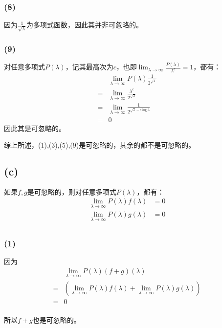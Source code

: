 \documentclass[twoside,11pt]{article}
\begin{document}
\subsubsection*{(8)}
因为$\frac{1}{\sqrt{\lambda}}$为多项式函数，因此其并非可忽略的。

\subsubsection*{(9)}
对任意多项式$P(\lambda)$，记其最高次为$c$，也即$\lim_{\lambda \to \infty} \frac{P(\lambda)}{\lambda^c}=1$，都有：
\begin{align*}
      & \lim_{\lambda \to \infty} P(\lambda) \frac{1}{2^{\sqrt{\lambda}}}     \\
    = & \lim_{\lambda \to \infty} \frac{\lambda^c}{2^{\sqrt{\lambda}}}        \\
    = & \lim_{\lambda \to \infty} \frac{1}{2^{\sqrt{\lambda}-c \log \lambda}} \\
    = & 0
\end{align*}
因此其是可忽略的。

综上所述，(1),(3),(5),(9)是可忽略的，其余的都不是可忽略的。

\subsection*{(c)}
如果$f,g$是可忽略的，则对任意多项式$P(\lambda)$，都有：
\begin{align*}
    \lim_{\lambda \to \infty} P(\lambda)f(\lambda) & = 0 \\
    \lim_{\lambda \to \infty} P(\lambda)g(\lambda) & = 0 \\
\end{align*}

\subsubsection*{(1)}
因为
\begin{align*}
      & \lim_{\lambda \to \infty} P(\lambda)(f+g)(\lambda)                                                \\
    = & (\lim_{\lambda \to \infty} P(\lambda)f(\lambda) + \lim_{\lambda \to \infty} P(\lambda)g(\lambda)) \\
    = & 0                                                                                                 \\
\end{align*}

所以$f+g$也是可忽略的。
\end{document}
